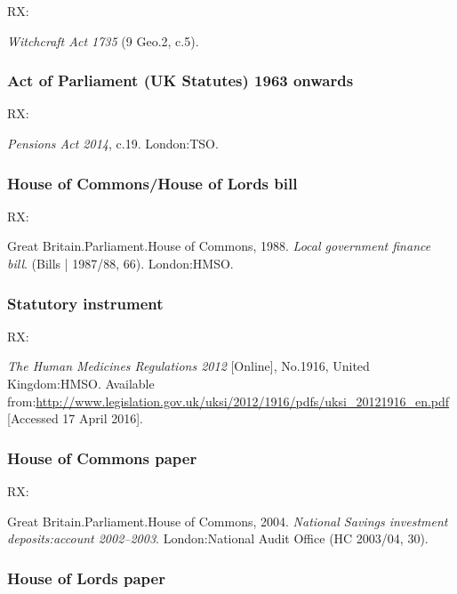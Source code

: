 RX: \cite{gb.wa1735}

\emph{Witchcraft Act 1735} (9 Geo.2, c.5).



\subsubsection*{Act of Parliament (UK Statutes) 1963 onwards}

RX: \cite{gb.pa2014}

\emph{Pensions Act 2014}, c.19. London:\@ TSO.



\subsubsection*{House of Commons/House of Lords bill}

RX: \cite{gb.bill1987/88-66}

Great Britain.\@ Parliament.\@ House of Commons, 1988. \emph{Local government finance bill}. (Bills | 1987/88, 66). London:\@ HMSO.




\subsubsection*{Statutory instrument}

RX: \cite{gb.hmr2012}

\emph{The Human Medicines Regulations 2012} [Online], No.1916, United Kingdom:\@ HMSO. Available from:\@ \url{http://www.legislation.gov.uk/uksi/2012/1916/pdfs/uksi_20121916_en.pdf} [Accessed 17 April 2016].




\subsubsection*{House of Commons paper}

RX: \cite{gb.hc2003/04-30}

Great Britain.\@ Parliament.\@ House of Commons, 2004. \emph{National Savings investment deposits:\@ account 2002--2003}. London:\@ National Audit Office (HC 2003/04, 30).



\subsubsection*{House of Lords paper}

